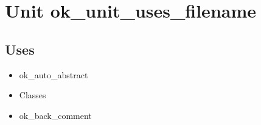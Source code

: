 \documentclass{report}
\begin{document}
\label{toc}\tableofcontents
\newpage
\newlength{\tmplength}
\chapter{Unit ok{\_}unit{\_}uses{\_}filename}
\label{ok_unit_uses_filename}
\section{Uses}
\begin{itemize}
\item \begin{ttfamily}ok{\_}auto{\_}abstract\end{ttfamily}\item \begin{ttfamily}Classes\end{ttfamily}\item \begin{ttfamily}ok{\_}back{\_}comment\end{ttfamily}\end{itemize}
\end{document}
